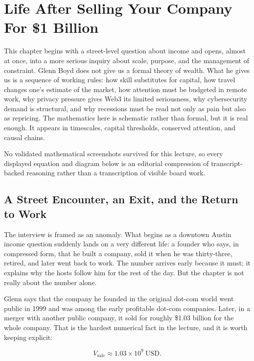 \chapter{Life After Selling Your Company For \$1 Billion}

This chapter begins with a street-level question about income and opens, almost at once, into a more serious inquiry about scale, purpose, and the management of constraint. Glenn Boyd does not give us a formal theory of wealth. What he gives us is a sequence of working rules: how skill substitutes for capital, how travel changes one's estimate of the market, how attention must be budgeted in remote work, why privacy pressure gives Web3 its limited seriousness, why cybersecurity demand is structural, and why recessions must be read not only as pain but also as repricing. The mathematics here is schematic rather than formal, but it is real enough. It appears in timescales, capital thresholds, conserved attention, and causal chains.

\begin{remark}
No validated mathematical screenshots survived for this lecture, so every displayed equation and diagram below is an editorial compression of transcript-backed reasoning rather than a transcription of visible board work.
\end{remark}

\section{A Street Encounter, an Exit, and the Return to Work}

The interview is framed as an anomaly. What begins as a downtown Austin income question suddenly lands on a very different life: a founder who says, in compressed form, that he built a company, sold it when he was thirty-three, retired, and later went back to work. The number arrives early because it must; it explains why the hosts follow him for the rest of the day. But the chapter is not really about the number alone.

Glenn says that the company he founded in the original dot-com world went public in 1999 and was among the early profitable dot-com companies. Later, in a merger with another public company, it sold for roughly \$1.03 billion for the whole company. That is the hardest numerical fact in the lecture, and it is worth keeping explicit:

\begin{equation}
V_{\mathrm{sale}} \approx 1.03\times 10^{9}\ \mathrm{USD}.
\end{equation}

